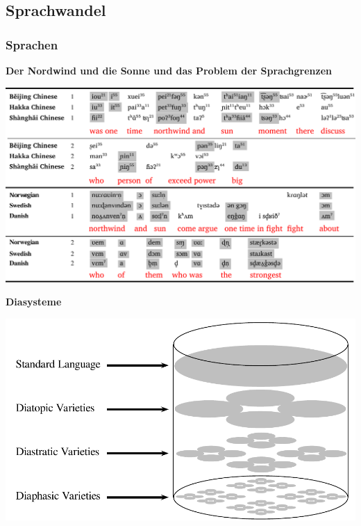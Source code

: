 
\subsection{\texorpdfstring{{Sprachwandel}}{Sprachwandel}}

\subsubsection{\texorpdfstring{{Sprachen}}{Sprachen}}

\vspace{0.5cm}\par\noindent\textbf{Der Nordwind und die Sonne und das Problem der Sprachgrenzen}\vspace{0.5cm}

\includegraphics[width=\textwidth]{img/northwind.pdf}

\vspace{0.5cm}\par\noindent\textbf{Diasysteme}\vspace{0.5cm}

\includegraphics[width=\textwidth]{img/diasystem.pdf}

